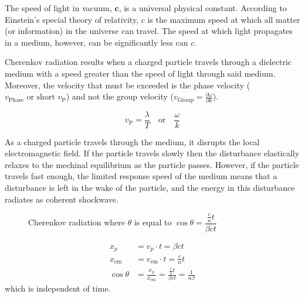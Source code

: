 \documentclass[11pt,twoside]{scrreprt}
\begin{document}
The speed of light in vacuum, \( \mathbf{c} \), is a universal physical constant. According to Einstein's special theory of relativity, \( c \) is the maximum speed at which all matter (or information) in the universe can travel. The speed at which light propagates in a medium, however, can be significantly less can \( c \).

Cherenkov radiation results when a charged particle travels through a dielectric medium with a speed greater than the speed of light through said medium. Moreover, the velocity that must be exceeded is the phase velocity (\( v_{\text{Phase}} \text{ or short } v_{\text{P}} \)) and not the group velocity (\( v_{\text{Group}} = \frac{\partial \omega}{\partial k} \)).

\[ v_{\text{P}} = \frac{\lambda}{T} \quad \text{or} \quad \frac{\omega}{k}\]

As a charged particle travels through the medium, it disrupts the local electromagnetic field. If the particle travels slowly then the disturbance elastically relaxes to the mechinal equilibrium as the particle passes. However, if the particle travels fast enough, the limited response speed of the medium means that a disturbance is left in the wake of the particle, and the energy in this disturbance radiates as coherent shockwave.

\begin{figure}[htbp]
  \centering
  \caption{Cherenkov radiation where $\theta$ is equal to $\cos\theta = \dfrac{\frac{c}{n}t}{\beta ct}$}
  \label{fig:label}
\end{figure}

\begin{align}
    x_p &= v_{p}\cdot t = \beta c t \nonumber \\
    x_{\text{em}} &= v_{\text{em}}\cdot t=\frac{c}{n}t \nonumber \\
    \cos\theta &= \frac{x_{\text{p}}}{x_{\text{em}}} = \frac{\frac{c}{n}t}{\beta c t} = \frac{1}{n\beta} \nonumber
\end{align}
which is independent of time.
\end{document}
